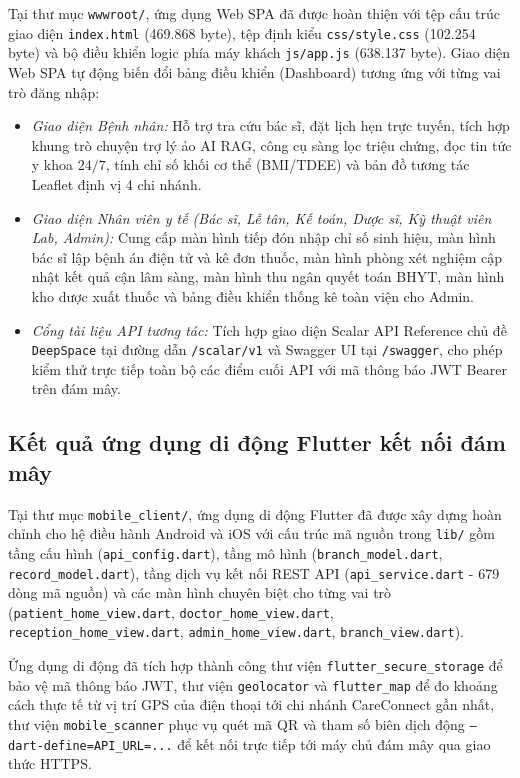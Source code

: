 Tại thư mục \texttt{wwwroot/}, ứng dụng Web SPA đã được hoàn thiện với tệp cấu trúc giao diện \texttt{index.html} (469.868 byte), tệp định kiểu \texttt{css/style.css} (102.254 byte) và bộ điều khiển logic phía máy khách \texttt{js/app.js} (638.137 byte). Giao diện Web SPA tự động biến đổi bảng điều khiển (Dashboard) tương ứng với từng vai trò đăng nhập:
\begin{itemize}
    \item \textit{Giao diện Bệnh nhân:} Hỗ trợ tra cứu bác sĩ, đặt lịch hẹn trực tuyến, tích hợp khung trò chuyện trợ lý ảo AI RAG, công cụ sàng lọc triệu chứng, đọc tin tức y khoa $24/7$, tính chỉ số khối cơ thể (BMI/TDEE) và bản đồ tương tác Leaflet định vị 4 chi nhánh.
    \item \textit{Giao diện Nhân viên y tế (Bác sĩ, Lễ tân, Kế toán, Dược sĩ, Kỹ thuật viên Lab, Admin):} Cung cấp màn hình tiếp đón nhập chỉ số sinh hiệu, màn hình bác sĩ lập bệnh án điện tử và kê đơn thuốc, màn hình phòng xét nghiệm cập nhật kết quả cận lâm sàng, màn hình thu ngân quyết toán BHYT, màn hình kho dược xuất thuốc và bảng điều khiển thống kê toàn viện cho Admin.
    \item \textit{Cổng tài liệu API tương tác:} Tích hợp giao diện Scalar API Reference chủ đề \texttt{DeepSpace} tại đường dẫn \texttt{/scalar/v1} và Swagger UI tại \texttt{/swagger}, cho phép kiểm thử trực tiếp toàn bộ các điểm cuối API với mã thông báo JWT Bearer trên đám mây.
\end{itemize}

\subsection{Kết quả ứng dụng di động Flutter kết nối đám mây}

Tại thư mục \texttt{mobile\_client/}, ứng dụng di động Flutter đã được xây dựng hoàn chỉnh cho hệ điều hành Android và iOS với cấu trúc mã nguồn trong \texttt{lib/} gồm tầng cấu hình (\texttt{api\_config.dart}), tầng mô hình (\texttt{branch\_model.dart}, \texttt{record\_model.dart}), tầng dịch vụ kết nối REST API (\texttt{api\_service.dart} - 679 dòng mã nguồn) và các màn hình chuyên biệt cho từng vai trò (\texttt{patient\_home\_view.dart}, \texttt{doctor\_home\_view.dart}, \texttt{reception\_home\_view.dart}, \texttt{admin\_home\_view.dart}, \texttt{branch\_view.dart}).

Ứng dụng di động đã tích hợp thành công thư viện \texttt{flutter\_secure\_storage} để bảo vệ mã thông báo JWT, thư viện \texttt{geolocator} và \texttt{flutter\_map} để đo khoảng cách thực tế từ vị trí GPS của điện thoại tới chi nhánh CareConnect gần nhất, thư viện \texttt{mobile\_scanner} phục vụ quét mã QR và tham số biên dịch động \texttt{--dart-define=API\_URL=...} để kết nối trực tiếp tới máy chủ đám mây qua giao thức HTTPS.
